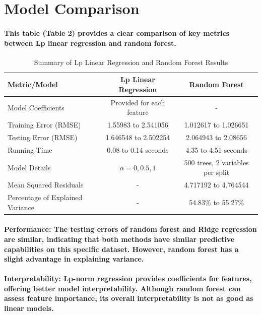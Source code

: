 \documentclass[11pt]{article} %
\begin{document}
\section{Model Comparison}
% 
% 
\paragraph{This table (Table 2) provides a clear comparison of key metrics between Lp linear regression and random forest.}
% 
\begin{table}[H]
    \centering
    \caption{Summary of Lp Linear Regression and Random Forest Results}
    \begin{tabular}{l c c}
        \hline
        \textbf{Metric/Model}            & \textbf{Lp Linear Regression} & \textbf{Random Forest}           \\ \hline
        Model Coefficients               & Provided for each feature     & -                                \\
        Training Error (RMSE)            & 1.55983 to 2.541056           & 1.012617 to 1.026651             \\
        Testing Error (RMSE)             & 1.646548 to 2.502254          & 2.064943 to 2.08656              \\
        Running Time                     & 0.08 to 0.14 seconds          & 4.35 to 4.51 seconds             \\
        Model Details                    & $\alpha=0,0.5,1$              & 500 trees, 2 variables per split \\
        Mean Squared Residuals           & -                             & 4.717192 to 4.764544             \\
        Percentage of Explained Variance & -                             & 54.83\% to 55.27\%               \\ \hline
    \end{tabular}
    \label{table:results_summary}
\end{table}
% 
% 
\paragraph{\textbf{Performance}: The testing errors of random forest and Ridge regression are similar, indicating that both methods have similar predictive capabilities on this specific dataset. However, random forest has a slight advantage in explaining variance.}
\paragraph{\textbf{Interpretability}: Lp-norm regression provides coefficients for features, offering better model interpretability. Although random forest can assess feature importance, its overall interpretability is not as good as linear models.}
\end{document}
